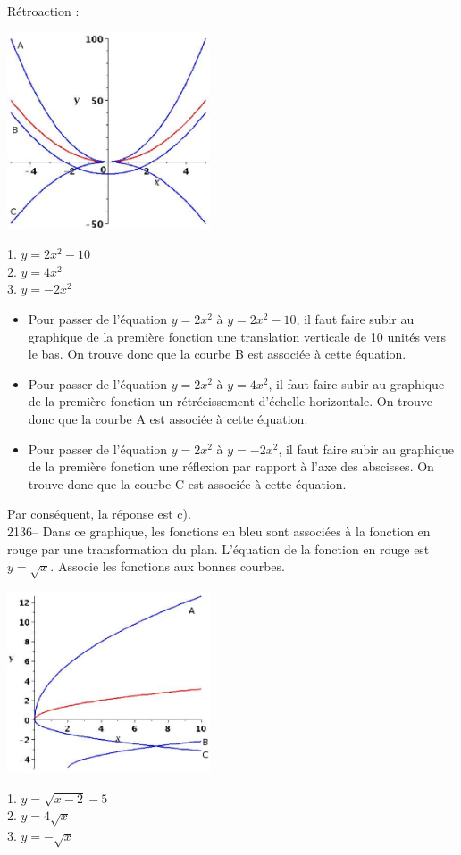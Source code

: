 \documentclass[letterpaper, 12pt]{article}
\begin{document}
R\'etroaction :
\begin{center}
 \includegraphics[width=6cm,bb=14 14 415 415]{Q2135.eps}
\end{center}
1. $y=2x^{2}-10$\\
2. $y=4x^{2}$\\
3. $y=-2x^{2}$\\
\begin{itemize}
 \item Pour passer de l'\'equation $y=2x^{2}$ \`a $y=2x^{2}-10$, il faut faire subir au graphique de la premi\`ere fonction une translation verticale de 10 unit\'es vers le bas. On trouve donc que la courbe B est associ\'ee \`a cette \'equation.
\item Pour passer de l'\'equation $y=2x^{2}$ \`a $y=4x^{2}$, il faut faire subir au graphique de la premi\`ere fonction un r\'etr\'ecissement d'\'echelle horizontale. On trouve donc que la courbe A est associ\'ee \`a cette \'equation.
\item Pour passer de l'\'equation $y=2x^{2}$ \`a $y=-2x^{2}$, il faut faire subir au graphique de la premi\`ere fonction une r\'eflexion par rapport \`a l'axe des abscisses. On trouve donc que la courbe C est associ\'ee \`a cette \'equation.
\end{itemize}
Par cons\'equent, la r\'eponse est c).\\

2136-- Dans ce graphique, les fonctions en bleu sont associ\'ees \`a la fonction en rouge par une transformation du plan. L'\'equation de la fonction en rouge est $y=\sqrt{x}$. Associe les fonctions aux bonnes courbes.
\begin{center}
 \includegraphics[width=6cm,bb=14 14 465 415]{Q2136.eps}
\end{center}
1. $y=\sqrt{x-2}-5$\\
2. $y=4\sqrt{x}$\\
3. $y=-\sqrt{x}$\\
\end{document}
